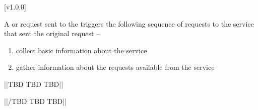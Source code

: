 [v1.0.0]
%

A  or
 request sent to the
 triggers the following sequence of
requests to the service that sent the original request --
\begin{enumerate}
\item \textbf{} collect basic information about the
service
\item \textbf{} gather information about the requests
available from the service
\end{enumerate}

			||TBD TBD TBD||

			||/TBD TBD TBD||

\appendixEnd{}
